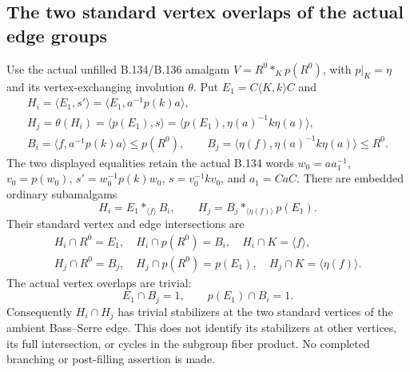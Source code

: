 \subsection*{The two standard vertex overlaps of the actual edge groups}

\label{stmt:B137}
Use the actual unfilled B.134/B.136 amalgam
$V=R^0*_{K}p(R^0)$, with $p|_K=\eta$ and its vertex-exchanging
involution $\theta$. Put $E_1=C\langle K,k\rangle C$ and
\begin{equation}\label{eq:B137-edge-groups}
 \begin{gathered}
 H_i=\langle E_1,s'\rangle
       =\langle E_1,a^{-1}p(k)a\rangle,\\
 H_j=\theta(H_i)=\langle p(E_1),s\rangle
       =\langle p(E_1),\eta(a)^{-1}k\eta(a)\rangle,\\
 B_i=\langle f,a^{-1}p(k)a\rangle\leq p(R^0),\qquad
 B_j=\langle\eta(f),\eta(a)^{-1}k\eta(a)\rangle\leq R^0.
 \end{gathered}
\end{equation}
The two displayed equalities retain the actual B.134 words
$w_0=aa_1^{-1}$, $v_0=p(w_0)$, $s'=w_0^{-1}p(k)w_0$,
$s=v_0^{-1}kv_0$, and $a_1=CaC$.
There are embedded ordinary subamalgams
\begin{equation}\label{eq:B137-subamalgams}
 H_i=E_1*_{\langle f\rangle}B_i,\qquad
 H_j=B_j*_{\langle\eta(f)\rangle}p(E_1).
\end{equation}
Their standard vertex and edge intersections are
\begin{equation}\label{eq:B137-standard-intersections}
 \begin{gathered}
 H_i\cap R^0=E_1,\quad H_i\cap p(R^0)=B_i,\quad
 H_i\cap K=\langle f\rangle,\\
 H_j\cap R^0=B_j,\quad H_j\cap p(R^0)=p(E_1),\quad
 H_j\cap K=\langle\eta(f)\rangle.
 \end{gathered}
\end{equation}
The actual vertex overlaps are trivial:
\begin{equation}\label{eq:B137-overlaps}
 E_1\cap B_j=1,\qquad p(E_1)\cap B_i=1.
\end{equation}
Consequently $H_i\cap H_j$ has trivial stabilizers at the two
standard vertices of the ambient Bass--Serre edge. This does not
identify its stabilizers at other vertices, its full intersection,
or cycles in the subgroup fiber product. No completed branching
or post-filling assertion is made.

